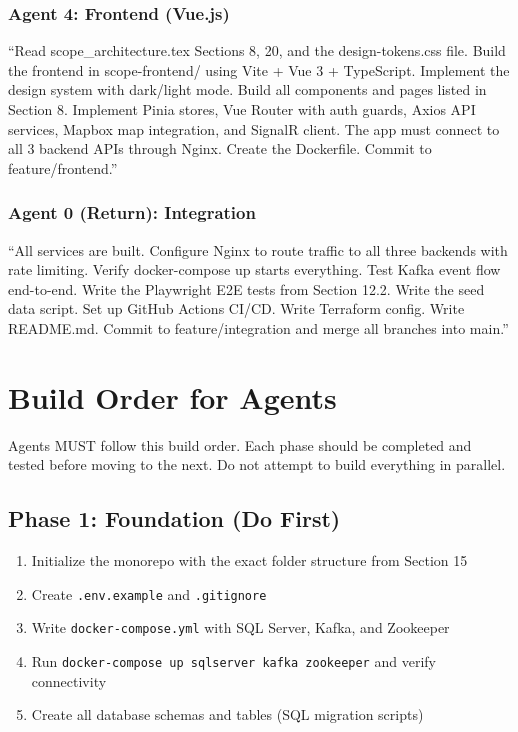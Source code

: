 \documentclass[12pt,letterpaper]{article}
\begin{document}
\subsubsection{Agent 4: Frontend (Vue.js)}
``Read scope\_architecture.tex Sections 8, 20, and the design-tokens.css file. Build the frontend in scope-frontend/ using Vite + Vue 3 + TypeScript. Implement the design system with dark/light mode. Build all components and pages listed in Section 8. Implement Pinia stores, Vue Router with auth guards, Axios API services, Mapbox map integration, and SignalR client. The app must connect to all 3 backend APIs through Nginx. Create the Dockerfile. Commit to feature/frontend.''

\subsubsection{Agent 0 (Return): Integration}
``All services are built. Configure Nginx to route traffic to all three backends with rate limiting. Verify docker-compose up starts everything. Test Kafka event flow end-to-end. Write the Playwright E2E tests from Section 12.2. Write the seed data script. Set up GitHub Actions CI/CD. Write Terraform config. Write README.md. Commit to feature/integration and merge all branches into main.''

\newpage

\section{Build Order for Agents}

Agents MUST follow this build order. Each phase should be completed and tested before moving to the next. Do not attempt to build everything in parallel.

\subsection{Phase 1: Foundation (Do First)}
\begin{enumerate}
  \item Initialize the monorepo with the exact folder structure from Section 15
  \item Create \texttt{.env.example} and \texttt{.gitignore}
  \item Write \texttt{docker-compose.yml} with SQL Server, Kafka, and Zookeeper
  \item Run \texttt{docker-compose up sqlserver kafka zookeeper} and verify connectivity
  \item Create all database schemas and tables (SQL migration scripts)
\end{enumerate}
\end{document}
